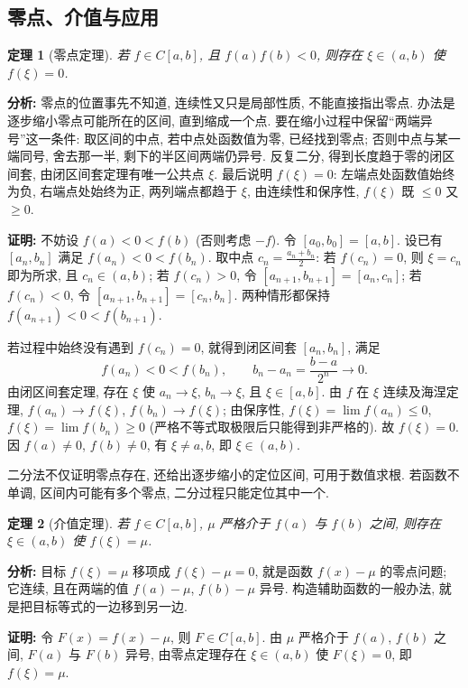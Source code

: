 \documentclass[UTF8,openany]{ctexbook}
\theoremstyle{chinesetextbook}
\newtheorem{theorem}{定理}[section]
\newenvironment{cnproof}{\par\indent\textbf{证明:} \ignorespaces}{\par}
\begin{document}
\subsection{零点、介值与应用}
\begin{theorem}[零点定理]
若 $f\in C[a,b]$, 且 $f(a)f(b)<0$, 则存在 $\xi\in(a,b)$ 使 $f(\xi)=0$.
\end{theorem}
\par\indent\textbf{分析:} 零点的位置事先不知道, 连续性又只是局部性质, 不能直接指出零点. 办法是逐步缩小零点可能所在的区间, 直到缩成一个点. 要在缩小过程中保留“两端异号”这一条件: 取区间的中点, 若中点处函数值为零, 已经找到零点; 否则中点与某一端同号, 舍去那一半, 剩下的半区间两端仍异号. 反复二分, 得到长度趋于零的闭区间套, 由闭区间套定理有唯一公共点 $\xi$. 最后说明 $f(\xi)=0$: 左端点处函数值始终为负, 右端点处始终为正, 两列端点都趋于 $\xi$, 由连续性和保序性, $f(\xi)$ 既 $\le0$ 又 $\ge0$.
\begin{cnproof}
不妨设 $f(a)<0<f(b)$ (否则考虑 $-f$). 令 $[a_0,b_0]=[a,b]$. 设已有 $[a_n,b_n]$ 满足 $f(a_n)<0<f(b_n)$. 取中点 $\displaystyle c_n=\frac{a_n+b_n}2$: 若 $f(c_n)=0$, 则 $\xi=c_n$ 即为所求, 且 $c_n\in(a,b)$; 若 $f(c_n)>0$, 令 $[a_{n+1},b_{n+1}]=[a_n,c_n]$; 若 $f(c_n)<0$, 令 $[a_{n+1},b_{n+1}]=[c_n,b_n]$. 两种情形都保持 $f(a_{n+1})<0<f(b_{n+1})$.

若过程中始终没有遇到 $f(c_n)=0$, 就得到闭区间套 $[a_n,b_n]$, 满足
\[
f(a_n)<0<f(b_n),\qquad b_n-a_n=\frac{b-a}{2^n}\to0.
\]
由闭区间套定理, 存在 $\xi$ 使 $a_n\to\xi$, $b_n\to\xi$, 且 $\xi\in[a,b]$. 由 $f$ 在 $\xi$ 连续及海涅定理, $f(a_n)\to f(\xi)$, $f(b_n)\to f(\xi)$; 由保序性, $f(\xi)=\lim f(a_n)\le0$, $f(\xi)=\lim f(b_n)\ge0$ (严格不等式取极限后只能得到非严格的). 故 $f(\xi)=0$. 因 $f(a)\ne0$, $f(b)\ne0$, 有 $\xi\ne a,b$, 即 $\xi\in(a,b)$.
\end{cnproof}
二分法不仅证明零点存在, 还给出逐步缩小的定位区间, 可用于数值求根. 若函数不单调, 区间内可能有多个零点, 二分过程只能定位其中一个.
\begin{theorem}[介值定理]
若 $f\in C[a,b]$, $\mu$ 严格介于 $f(a)$ 与 $f(b)$ 之间, 则存在 $\xi\in(a,b)$ 使 $f(\xi)=\mu$.
\end{theorem}
\par\indent\textbf{分析:} 目标 $f(\xi)=\mu$ 移项成 $f(\xi)-\mu=0$, 就是函数 $f(x)-\mu$ 的零点问题; 它连续, 且在两端的值 $f(a)-\mu$, $f(b)-\mu$ 异号. 构造辅助函数的一般办法, 就是把目标等式的一边移到另一边.
\begin{cnproof}
令 $F(x)=f(x)-\mu$, 则 $F\in C[a,b]$. 由 $\mu$ 严格介于 $f(a)$, $f(b)$ 之间, $F(a)$ 与 $F(b)$ 异号, 由零点定理存在 $\xi\in(a,b)$ 使 $F(\xi)=0$, 即 $f(\xi)=\mu$.
\end{cnproof}
\end{document}

